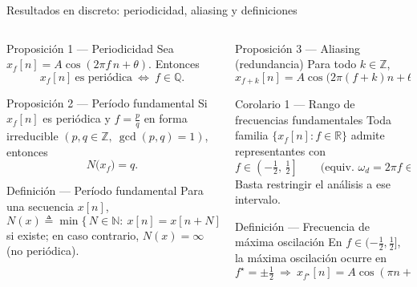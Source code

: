 \documentclass[
    10pt,
    aspectratio=169,
    xcolor={dvipsnames},
    spanish,
    ]{beamer}
\begin{document}
\begin{frame}{Resultados en discreto: periodicidad, aliasing y definiciones}
\footnotesize
\begin{columns}[T,onlytextwidth]

\begin{column}{0.49\textwidth}
  \begin{block}{Proposición 1 — Periodicidad}
    Sea \(x_f[n]=A\cos(2\pi f\,n+\theta)\). Entonces
    \[
      x_f[n]\ \text{es periódica}\ \Longleftrightarrow\ f\in\mathbb{Q}.
    \]
  \end{block}

  \begin{block}{Proposición 2 — Período fundamental}
    Si \(x_f[n]\) es periódica y \(f=\tfrac{p}{q}\) en forma irreducible
    \((p,q\in\mathbb{Z},\ \gcd(p,q)=1)\), entonces
    \[
      N\big(x_f\big)=q.
    \]
  \end{block}

  \begin{block}{Definición — Período fundamental}
    Para una secuencia \(x[n]\),
    \[
      N(x)\triangleq \min\{\,N\in\mathbb{N}:\ x[n]=x[n+N]\ \forall n\,\},
    \]
    si existe; en caso contrario, \(N(x)=\infty\) (no periódica).
  \end{block}
\end{column}

\begin{column}{0.49\textwidth}
  \begin{block}{Proposición 3 — Aliasing (redundancia)}
    Para todo \(k\in\mathbb{Z}\),
    \[
      x_{f+k}[n]=A\cos\!\big(2\pi(f+k)n+\theta\big)=A\cos(2\pi f\,n+\theta)=x_f[n].
    \]
  \end{block}

  \begin{block}{Corolario 1 — Rango de frecuencias fundamentales}
    Toda familia \(\{x_f[n]: f\in\mathbb{R}\}\) admite representantes con
    \[
      f\in\left(-\tfrac{1}{2},\,\tfrac{1}{2}\right] \qquad
      \text{(equiv. } \omega_d=2\pi f\in(-\pi,\pi]\text{)}.
    \]
    Basta restringir el análisis a ese intervalo.
  \end{block}

  \begin{block}{Definición — Frecuencia de máxima oscilación}
    En \(f\in(-\tfrac12,\tfrac12]\), la máxima oscilación ocurre en
    \[
      f^\star=\pm\tfrac{1}{2}\ \Rightarrow\ x_{f^\star}[n]=A\cos(\pi n+\theta),\quad
      N\!\left(x_{f^\star}\right)=2.
    \]
  \end{block}
\end{column}

\end{columns}
\end{frame}
\end{document}
